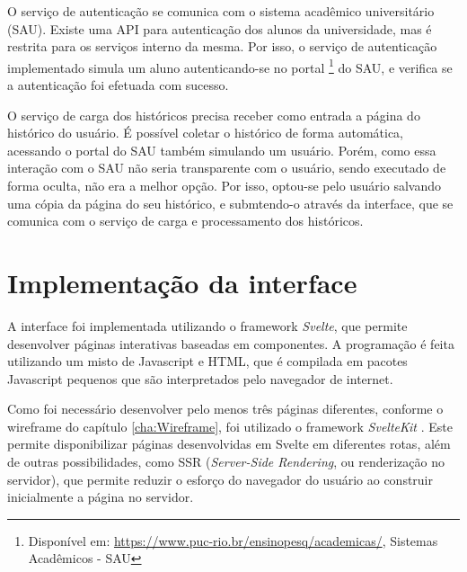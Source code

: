 O serviço de autenticação se comunica com o sistema acadêmico universitário (SAU). Existe uma API para autenticação dos alunos da universidade, mas é restrita para os serviços interno da mesma. Por isso, o serviço de autenticação implementado simula um aluno autenticando-se no portal \footnote{Disponível em: \url{https://www.puc-rio.br/ensinopesq/academicas/}, Sistemas Acadêmicos - SAU} do SAU, e verifica se a autenticação foi efetuada com sucesso.

O serviço de carga dos históricos precisa receber como entrada a página do histórico do usuário. É possível coletar o histórico de forma automática, acessando o portal do SAU também simulando um usuário. Porém, como essa interação com o SAU não seria transparente com o usuário, sendo executado de forma oculta, não era a melhor opção. Por isso, optou-se pelo usuário salvando uma cópia da página do seu histórico, e submtendo-o através da interface, que se comunica com o serviço de carga e processamento dos históricos. 

\section{Implementação da interface}

A interface foi implementada utilizando o framework \textit{Svelte}, que permite desenvolver páginas interativas baseadas em componentes. A programação é feita utilizando um misto de Javascript e HTML, que é compilada em pacotes Javascript pequenos que são interpretados pelo navegador de internet. 

Como foi necessário desenvolver pelo menos três páginas diferentes, conforme o wireframe do capítulo \ref{cha:Wireframe}, foi utilizado o framework \textit{SvelteKit} \cite{site-sveltekit}. Este permite disponibilizar páginas desenvolvidas em Svelte em diferentes rotas, além de outras possibilidades, como SSR (\textit{Server-Side Rendering}, ou renderização no servidor), que permite reduzir o esforço do navegador do usuário ao construir inicialmente a página no servidor. 
